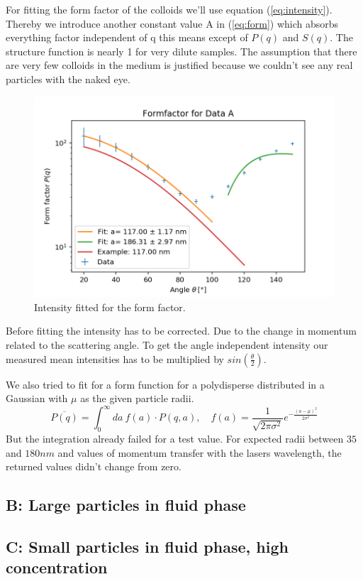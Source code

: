 \documentclass[]{article}
\begin{document}
For fitting the form factor of the colloids we'll use equation (\ref{eq:intensity}). Thereby we introduce another constant value A in (\ref{eq:form}) which absorbs everything factor independent of q this means except of $P(q)$ and $S(q)$. The structure function is nearly 1 for very dilute samples. The assumption that there are very few colloids in the medium is justified because we couldn't see any real particles with the naked eye. 

\begin{figure}[!htbp]
\centering
\includegraphics[width=0.8\linewidth]{Plots/FormA.png}
\caption{Intensity fitted for the form factor.}
\label{FormA}
\end{figure}

Before fitting the intensity has to be corrected. Due to the change in momentum related to the scattering angle. To get the angle independent intensity our measured mean intensities has to be multiplied by $sin(\frac{\theta}{2} )$.


We also tried to fit for a form function for a polydisperse distributed in a Gaussian with $\mu$ as the given particle radii. 
\[ \overline{P(q)} = \int_0^\infty da\: f(a)\cdot P(q,a) , \quad f(a)= \frac{1}{\sqrt{2 \pi \sigma^2}} e^{-\frac{(a-\mu)^2}{2 \sigma^2}} \]
But the integration already failed for a test value. For expected radii between $35$ and $180nm$ and values of momentum transfer with the lasers wavelength, the returned values didn't change from zero. 


\subsection{B: Large particles in fluid phase}


\subsection{C: Small particles in fluid phase, high concentration}
\end{document}
